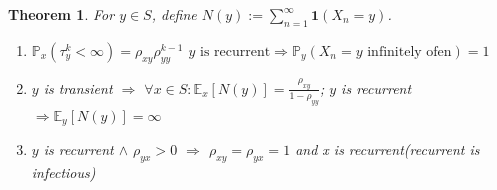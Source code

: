 \documentclass[a4paper,11pt]{book}
\newtheorem{theorem}{Theorem}[section]
\theoremstyle{definition}
\theoremstyle{remark}
\begin{document}
 \begin{theorem}
 	 For $y \in S$, define $N(y):= \sum_{n = 1}^\infty \textbf{1}(X_n = y)$.
 	 \begin{enumerate}
 	 	\item $\mathbb{P}_x(\tau_y^k < \infty) = \rho_{xy}\rho_{yy}^{k-1}$\newline
 	 		$y \text{ is recurrent} \Rightarrow \mathbb{P}_y(X_n = y \text{ infinitely ofen}) = 1$

 	 	\item $y$ is transient $\Rightarrow$ $\forall x \in S:\mathbb{E}_x[N(y)] = \frac{\rho_{xy}}{1 - \rho_{yy}}$; \newline
 	 		  $y$ is recurrent $\Rightarrow \mathbb{E}_y[N(y)] = \infty$
 	 	\item $y$ is recurrent $\wedge$ $\rho_{yx} > 0$ $\Rightarrow$ $\rho_{xy} = \rho_{yx} = 1$ and x is recurrent(recurrent is infectious)
 	 \end{enumerate}
 \end{theorem}
\end{document}
